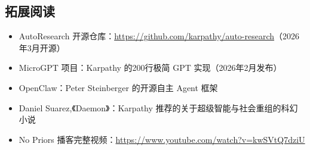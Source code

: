 \documentclass[a4paper]{article}
\begin{document}
\subsection{拓展阅读}

\begin{itemize}
    \item AutoResearch 开源仓库：\url{https://github.com/karpathy/auto-research}（2026年3月开源）
    \item MicroGPT 项目：Karpathy 的200行极简 GPT 实现（2026年2月发布）
    \item OpenClaw：Peter Steinberger 的开源自主 Agent 框架
    \item Daniel Suarez,《Daemon》：Karpathy 推荐的关于超级智能与社会重组的科幻小说
    \item No Priors 播客完整视频：\url{https://www.youtube.com/watch?v=kwSVtQ7dziU}
\end{itemize}

\end{document}
